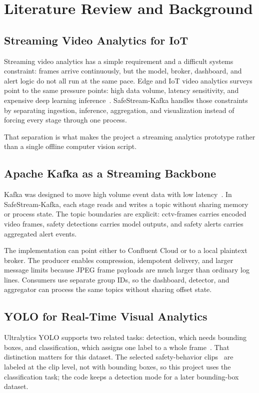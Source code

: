 \documentclass[conference]{IEEEtran}
\begin{document}
\section{Literature Review and Background}

\subsection{Streaming Video Analytics for IoT}

Streaming video analytics has a simple requirement and a difficult systems constraint: frames arrive continuously, but the model, broker, dashboard, and alert logic do not all run at the same pace. Edge and IoT video analytics surveys point to the same pressure points: high data volume, latency sensitivity, and expensive deep learning inference~\cite{b1,b2}. SafeStream-Kafka handles those constraints by separating ingestion, inference, aggregation, and visualization instead of forcing every stage through one process.

That separation is what makes the project a streaming analytics prototype rather than a single offline computer vision script.

\subsection{Apache Kafka as a Streaming Backbone}

Kafka was designed to move high volume event data with low latency~\cite{b3}. In SafeStream-Kafka, each stage reads and writes a topic without sharing memory or process state. The topic boundaries are explicit: cctv-frames carries encoded video frames, safety detections carries model outputs, and safety alerts carries aggregated alert events.

The implementation can point either to Confluent Cloud or to a local plaintext broker. The producer enables compression, idempotent delivery, and larger message limits because JPEG frame payloads are much larger than ordinary log lines. Consumers use separate group IDs, so the dashboard, detector, and aggregator can process the same topics without sharing offset state.

\subsection{YOLO for Real-Time Visual Analytics}
Ultralytics YOLO supports two related tasks: detection, which needs bounding boxes, and classification, which assigns one label to a whole frame~\cite{b4,b5}. That distinction matters for this dataset. The selected safety-behavior clips~\cite{b6} are labeled at the clip level, not with bounding boxes, so this project uses the classification task; the code keeps a detection mode for a later bounding-box dataset.
\end{document}
